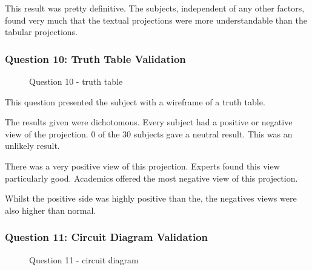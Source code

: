 This result was pretty definitive.
The subjects, independent of any other factors, found very much that the textual projections were more understandable than the tabular projections.

\subsubsection{Question 10: Truth Table Validation}

\begin{figure}[H]
    \centering
    \caption{Question 10 - truth table}
    \label{fig:stackedbar_Q6}
\end{figure}

This question presented the subject with a wireframe of a truth table.

The results given were dichotomous.
Every subject had a positive or negative view of the projection.
0 of the 30 subjects gave a neutral result.
This was an unlikely result.

There was a very positive view of this projection.
Experts found this view particularly good.
Academics offered the most negative view of this projection.

Whilst the positive side was highly positive than the, the negatives views were also higher than normal. 

\subsubsection{Question 11: Circuit Diagram Validation}

\begin{figure}[H]
    \centering
    \caption{Question 11 - circuit diagram}
    \label{fig:stackedbar_Q7}
\end{figure}

